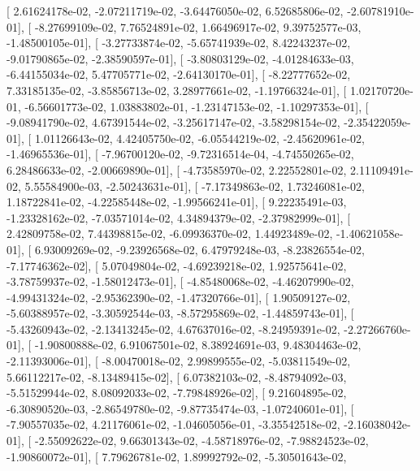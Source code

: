 \documentclass{article}
\begin{document}
       [  2.61624178e-02,  -2.07211719e-02,  -3.64476050e-02,
          6.52685806e-02,  -2.60781910e-01],
       [ -8.27699109e-02,   7.76524891e-02,   1.66496917e-02,
          9.39752577e-03,  -1.48500105e-01],
       [ -3.27733874e-02,  -5.65741939e-02,   8.42243237e-02,
         -9.01790865e-02,  -2.38590597e-01],
       [ -3.80803129e-02,  -4.01284633e-03,  -6.44155034e-02,
          5.47705771e-02,  -2.64130170e-01],
       [ -8.22777652e-02,   7.33185135e-02,  -3.85856713e-02,
          3.28977661e-02,  -1.19766324e-01],
       [  1.02170720e-01,  -6.56601773e-02,   1.03883802e-01,
         -1.23147153e-02,  -1.10297353e-01],
       [ -9.08941790e-02,   4.67391544e-02,  -3.25617147e-02,
         -3.58298154e-02,  -2.35422059e-01],
       [  1.01126643e-02,   4.42405750e-02,  -6.05544219e-02,
         -2.45620961e-02,  -1.46965536e-01],
       [ -7.96700120e-02,  -9.72316514e-04,  -4.74550265e-02,
          6.28486633e-02,  -2.00669890e-01],
       [ -4.73585970e-02,   2.22552801e-02,   2.11109491e-02,
          5.55584900e-03,  -2.50243631e-01],
       [ -7.17349863e-02,   1.73246081e-02,   1.18722841e-02,
         -4.22585448e-02,  -1.99566241e-01],
       [  9.22235491e-03,  -1.23328162e-02,  -7.03571014e-02,
          4.34894379e-02,  -2.37982999e-01],
       [  2.42809758e-02,   7.44398815e-02,  -6.09936370e-02,
          1.44923489e-02,  -1.40621058e-01],
       [  6.93009269e-02,  -9.23926568e-02,   6.47979248e-03,
         -8.23826554e-02,  -7.17746362e-02],
       [  5.07049804e-02,  -4.69239218e-02,   1.92575641e-02,
         -3.78759937e-02,  -1.58012473e-01],
       [ -4.85480068e-02,  -4.46207990e-02,  -4.99431324e-02,
         -2.95362390e-02,  -1.47320766e-01],
       [  1.90509127e-02,  -5.60388957e-02,  -3.30592544e-03,
         -8.57295869e-02,  -1.44859743e-01],
       [ -5.43260943e-02,  -2.13413245e-02,   4.67637016e-02,
         -8.24959391e-02,  -2.27266760e-01],
       [ -1.90800888e-02,   6.91067501e-02,   8.38924691e-03,
          9.48304463e-02,  -2.11393006e-01],
       [ -8.00470018e-02,   2.99899555e-02,  -5.03811549e-02,
          5.66112217e-02,  -8.13489415e-02],
       [  6.07382103e-02,  -8.48794092e-03,  -5.51529944e-02,
          8.08092033e-02,  -7.79848926e-02],
       [  9.21604895e-02,  -6.30890520e-03,  -2.86549780e-02,
         -9.87735474e-03,  -1.07240601e-01],
       [ -7.90557035e-02,   4.21176061e-02,  -1.04605056e-01,
         -3.35542518e-02,  -2.16038042e-01],
       [ -2.55092622e-02,   9.66301343e-02,  -4.58718976e-02,
         -7.98824523e-02,  -1.90860072e-01],
       [  7.79626781e-02,   1.89992792e-02,  -5.30501643e-02,
\end{document}
